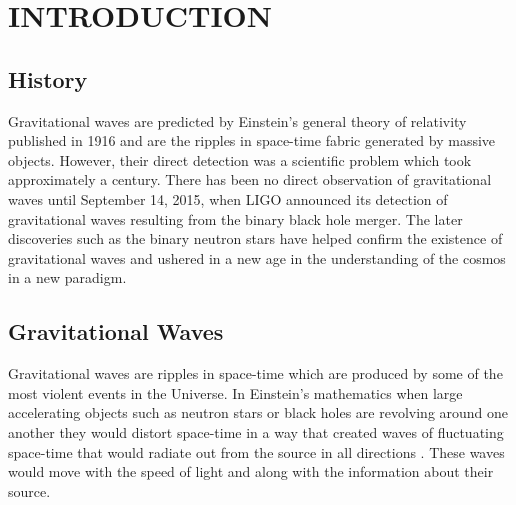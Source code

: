\chapter{INTRODUCTION}
\onehalfspacing
\setlength{\parindent}{0pt}

\section{History}
Gravitational waves are predicted by Einstein’s general theory of relativity published in 1916 \cite{einstein1916naherungsweise} and are the ripples in space-time fabric generated by massive objects. However, their direct detection was a scientific problem which took approximately a century. There has been no direct observation of gravitational waves until September 14, 2015, when LIGO announced its detection of gravitational waves \citep{abbott2016observation} resulting from the binary black hole merger. The later discoveries such as the binary neutron stars have helped confirm the existence of gravitational waves and ushered in a new age in the understanding of the cosmos in a new paradigm.
\section{Gravitational Waves}
Gravitational waves are ripples in space-time which are produced by some of the most violent events in the Universe. In Einstein’s mathematics \cite{einstein1916naherungsweise} when large accelerating objects such as neutron stars or black holes are revolving around one another they would distort space-time in a way that created waves of fluctuating space-time that would radiate out from the source in all directions \citep{thesis}\citep{Hughes_2009}. These waves would move with the speed of light and along with the information about their source.
